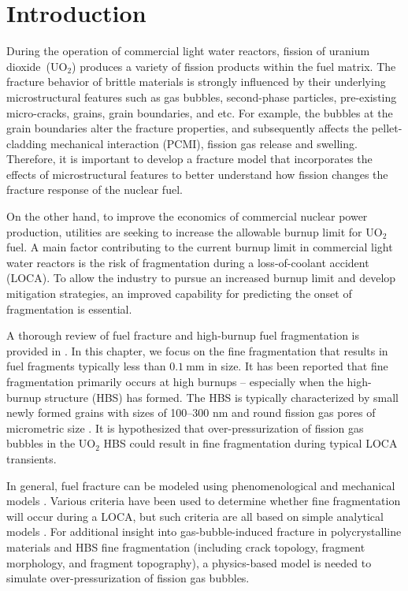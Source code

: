\section{Introduction}
\label{section: brittle/intro}

During the operation of commercial light water reactors, fission of uranium dioxide~(UO$_2$) produces a variety of fission products within the fuel matrix. The fracture behavior of brittle materials is strongly influenced by their underlying microstructural features such as gas bubbles, second-phase particles, pre-existing micro-cracks, grains, grain boundaries, and etc. For example, the bubbles at the grain boundaries alter the fracture properties, and subsequently affects the pellet-cladding mechanical interaction (PCMI), fission gas release and swelling. Therefore, it is important to develop a fracture model that incorporates the effects of microstructural features to better understand how fission changes the fracture response of the nuclear fuel.

On the other hand, to improve the economics of commercial nuclear power production, utilities are seeking to increase the allowable burnup limit for UO$_2$ fuel. A main factor contributing to the current burnup limit in commercial light water reactors is the risk of fragmentation during a loss-of-coolant accident (LOCA). To allow the industry to pursue an increased burnup limit and develop mitigation strategies, an improved capability for predicting the onset of fragmentation is essential.

A thorough review of fuel fracture and high-burnup fuel fragmentation is provided in \cite{CAPPS2021152750}. In this chapter, we focus on the fine fragmentation that results in fuel fragments typically less than $\SI{0.1}{\milli\meter}$ in size. It has been reported that fine fragmentation primarily occurs at high burnups -- especially when the high-burnup structure (HBS) has formed. The HBS is typically characterized by small newly formed grains with sizes of 100--300 nm and round fission gas pores of micrometric size \cite{RONDINELLA201024}. It is hypothesized that over-pressurization of fission gas bubbles in the UO$_2$ HBS could result in fine fragmentation during typical LOCA transients.

In general, fuel fracture can be modeled using phenomenological \cite{Turnbull2015} and mechanical models \cite{JIANG2020106713}. Various criteria have been used to determine whether fine fragmentation will occur during a LOCA, but such criteria are all based on simple analytical models \cite{KULACSY2015409, JERNKVIST2020103188}. For additional insight into gas-bubble-induced fracture in polycrystalline materials and HBS fine fragmentation (including crack topology, fragment morphology, and fragment topography), a physics-based model is needed to simulate over-pressurization of fission gas bubbles.

